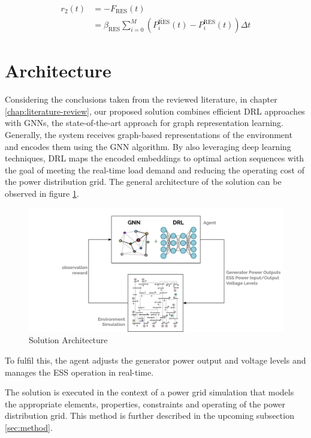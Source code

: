 \begin{description}
	\begin{equation}
		\begin{split}
			r_2(t) &= - F_\text{RES}(t) \\
			&= \beta_\text{RES} \sum^M_{i=0} (\overline{P^\text{RES}_i}(t) - P^\text{RES}_i(t)) \Delta t
		\end{split}
	\end{equation}
	
\end{description}

\section{Architecture} \label{sec:arch}

Considering the conclusions taken from the reviewed literature, in chapter \ref{chap:literature-review}, our proposed solution combines efficient \acf{DRL} approaches with \acfp{GNN}, the state-of-the-art approach for graph representation learning. Generally, the system receives graph-based representations of the environment and encodes them using the \ac{GNN} algorithm. By also leveraging deep learning techniques, \ac{DRL} maps the encoded embeddings to optimal action sequences with the goal of meeting the real-time load demand and reducing the operating cost of the power distribution grid. The general architecture of the solution can be observed in figure \ref{fig:arch}.

\begin{figure}
	\centering
	\includegraphics[width=0.85\linewidth]{./figures/arch.png}
	\caption{Solution Architecture}
	\label{fig:arch}
\end{figure}


To fulfil this, the agent adjusts the generator power output and voltage levels and manages the \ac{ESS} operation in real-time. \par
The solution is executed in the context of a power grid simulation that models the appropriate elements, properties, constraints and operating of the power distribution grid. This method is further described in the upcoming subsection \ref{sec:method}.



